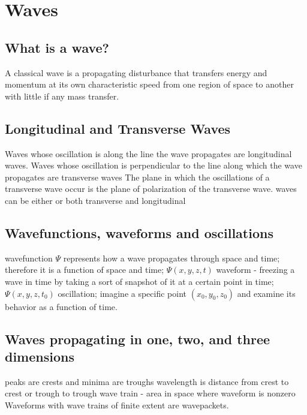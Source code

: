 \documentclass[twocolumn]{article}
\begin{document}
\section{Waves}
\subsection{What is a wave?}
\begin{outline}
    \1 A classical wave is a propagating disturbance that transfers energy and momentum at its own characteristic speed from one region of space to another with little if any mass transfer.
\end{outline}
\subsection{Longitudinal and Transverse Waves}
\begin{outline}
    \1 Waves whose oscillation is along the line the wave propagates are longitudinal waves. 
    \1 Waves whose oscillation is perpendicular to the line along which the wave propagates are transverse waves
    \1 The plane in which the oscillations of a transverse wave occur is the plane of polarization of the transverse wave. 
    \1 waves can be either or both transverse and longitudinal
\end{outline}
\subsection{Wavefunctions, waveforms and oscillations}
\begin{outline}
    \1 wavefunction $\Psi$ represents how a wave propagates through space and time; therefore it is a function of space and time; \(\Psi(x,y,z,t)\)
    \1 waveform - freezing a wave in time by taking a sort of snapshot of it at a certain point in time; \(\Psi(x,y,z,t_0)\)
    \1 oscillation; imagine a specific point \((x_0,y_0,z_0)\) and examine its behavior as a function of time. 
\end{outline}
\subsection{Waves propagating in one, two, and three dimensions}
\begin{outline}
    \1 peaks are crests and minima are troughs
    \1 wavelength is distance from crest to crest or trough to trough
    \1 wave train - area in space where waveform is nonzero
    \1 Waveforms with wave trains of finite extent are wavepackets. 
\end{outline}
\end{document}
